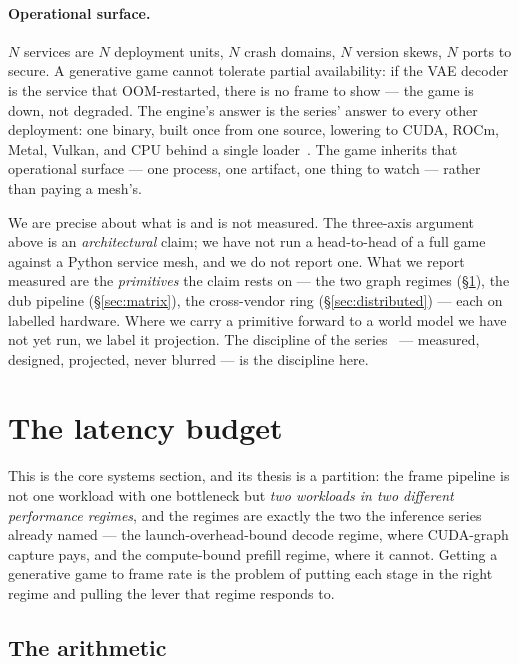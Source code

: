 \documentclass[11pt]{article}
\begin{document}
\paragraph{Operational surface.} $N$ services are $N$ deployment units, $N$ crash domains, $N$ version
skews, $N$ ports to secure. A generative game cannot tolerate partial availability: if the VAE decoder is the
service that OOM-restarted, there is no frame to show --- the game is down, not degraded. The engine's answer
is the series' answer to every other deployment: one binary, built once from one source, lowering to CUDA,
ROCm, Metal, Vulkan, and CPU behind a single loader~\cite{backend,umbrella}. The game inherits that operational
surface --- one process, one artifact, one thing to watch --- rather than paying a mesh's.

We are precise about what is and is not measured. The three-axis argument above is an \emph{architectural}
claim; we have not run a head-to-head of a full game against a Python service mesh, and we do not report one.
What we report measured are the \emph{primitives} the claim rests on --- the two graph regimes
(\S\ref{sec:latency}), the dub pipeline (\S\ref{sec:matrix}), the cross-vendor ring
(\S\ref{sec:distributed}) --- each on labelled hardware. Where we carry a primitive forward to a world model
we have not yet run, we label it projection. The discipline of the series~\cite{het,openproblems} ---
measured, designed, projected, never blurred --- is the discipline here.

\section{The latency budget}
\label{sec:latency}

This is the core systems section, and its thesis is a partition: the frame pipeline is not one workload with
one bottleneck but \emph{two workloads in two different performance regimes}, and the regimes are exactly the
two the inference series already named --- the launch-overhead-bound decode regime, where CUDA-graph capture
pays, and the compute-bound prefill regime, where it cannot. Getting a generative game to frame rate is the
problem of putting each stage in the right regime and pulling the lever that regime responds to.

\subsection{The arithmetic}
\label{sec:budget}
\end{document}
